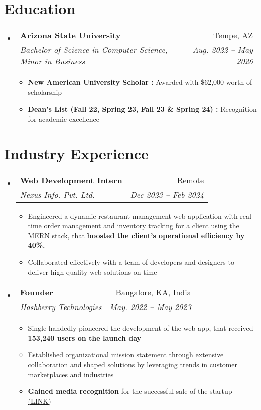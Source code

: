 \documentclass[letterpaper,11pt]{article}
\makeatletter
\newcommand{\resumeItem}[1]{
  \item\small{
    {#1 \vspace{-2pt}}
  }
}
\newcommand{\resumeSubheading}[4]{
  \vspace{-2pt}\item
    \begin{tabular*}{0.97\textwidth}[t]{l@{\extracolsep{\fill}}r}
      \textbf{#1} & #2 \\
      \textit{\small#3} & \textit{\small #4} \\
    \end{tabular*}\vspace{-7pt}
}
\newcommand{\resumeSubSubheading}[2]{
    \item
    \begin{tabular*}{0.97\textwidth}{l@{\extracolsep{\fill}}r}
      \textit{\small#1} & \textit{\small #2} \\
    \end{tabular*}\vspace{-7pt}
}
\newcommand{\resumeSubHeadingListStart}{\begin{itemize}[leftmargin=0.15in, label={}]}
\newcommand{\resumeSubHeadingListEnd}{\end{itemize}}
\newcommand{\resumeItemListStart}{\begin{itemize}}
\newcommand{\resumeItemListEnd}{\end{itemize}\vspace{-5pt}}
\makeatother
\begin{document}
\section{Education}
  \resumeSubHeadingListStart
    \resumeSubheading
      {Arizona State University}{Tempe, AZ}
      {Bachelor of Science in Computer Science, Minor in Business}{Aug. 2022 -- May 2026}
      \resumeItemListStart
        \resumeItem{\textbf{New American University Scholar :} Awarded with \$62,000 worth of scholarship}
        \resumeItem{\textbf{Dean’s List (Fall 22, Spring 23, Fall 23 \& Spring 24) :} Recognition for academic excellence}      
      \resumeItemListEnd
   
\resumeSubHeadingListEnd

\section{Industry Experience}
  \resumeSubHeadingListStart

    \resumeSubheading
      {Web Development Intern}{Remote}
      {Nexus Info. Pvt. Ltd.}{Dec 2023 -- Feb 2024}
      \resumeItemListStart
        \resumeItem{Engineered a dynamic restaurant management web application with real-time order management and inventory tracking for a client using the MERN stack, that \textbf{boosted the client's operational efficiency by 40\%.}}
        \resumeItem{Collaborated effectively with a team of developers and designers to deliver high-quality web solutions on time}
      \resumeItemListEnd

      \resumeSubheading
      {Founder}{Bangalore, KA, India}
      {Hashberry Technologies}{May. 2022 -- May 2023}
      \resumeItemListStart
        \resumeItem{Single-handedly pioneered the development of the web app, that received \textbf{153,240 users on the launch day}}
        \resumeItem{Established organizational mission statement through extensive collaboration and shaped solutions by leveraging trends in customer marketplaces and industries}
        \resumeItem{\textbf{Gained media recognition} for the successful sale of the startup 
\href{https://www.deccanherald.com/brandspot/sponsored/meet-the-crypto-boy-of-bengaluru-1221031.html}{(LINK)}}
      \resumeItemListEnd
\resumeSubHeadingListEnd


      
\end{document}
